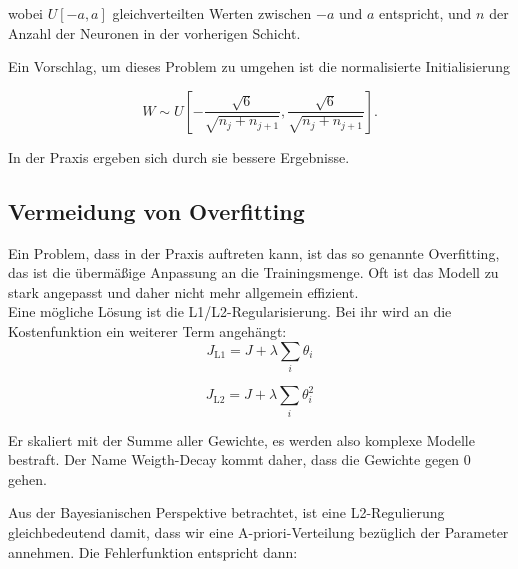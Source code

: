wobei $U[-a, a]$ gleichverteilten Werten zwischen $-a$ und $a$ entspricht, und $n$ der Anzahl der Neuronen in der vorherigen Schicht. 

Ein Vorschlag, um dieses Problem zu umgehen ist die normalisierte Initialisierung

\begin{equation}
	W \sim U [ - \frac{\sqrt{6}}{\sqrt{n_j+n_{j+1}}} 
	, 			 \frac{\sqrt{6}}{\sqrt{n_j+n_{j+1}}} ]. 
\end{equation}

In der Praxis ergeben sich durch sie bessere Ergebnisse. \cite{glorot2010understanding}

\subsection{Vermeidung von Overfitting}
Ein Problem, dass in der Praxis auftreten kann, ist das so genannte Overfitting, das ist die übermäßige Anpassung an die Trainingsmenge. Oft ist das Modell zu stark angepasst und daher nicht mehr allgemein effizient.\\

Eine mögliche Lösung ist die L1/L2-Regularisierung. Bei ihr wird an die Kostenfunktion ein weiterer Term angehängt:\\

\begin{equation}
	J_{\text{L1}} = J + \lambda \sum_i \theta_i 
\end{equation}

\begin{equation}
	J_{\text{L2}} = J + \lambda \sum_i \theta_i^2
\end{equation}


Er skaliert mit der Summe aller Gewichte, es werden also komplexe Modelle bestraft. Der Name Weigth-Decay kommt daher, dass die Gewichte gegen 0 gehen. \cite{Hastie2009} %
\\


Aus der Bayesianischen Perspektive betrachtet, ist eine L2-Regulierung gleichbedeutend damit, dass wir eine A-priori-Verteilung bezüglich der Parameter annehmen. Die Fehlerfunktion entspricht dann:

